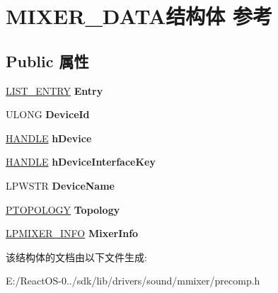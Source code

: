 \hypertarget{struct_m_i_x_e_r___d_a_t_a}{}\section{M\+I\+X\+E\+R\+\_\+\+D\+A\+T\+A结构体 参考}
\label{struct_m_i_x_e_r___d_a_t_a}
\subsection*{Public 属性}
\begin{DoxyCompactItemize}
\item 
\mbox{\label{struct_m_i_x_e_r___d_a_t_a_a5e96e18652301b34dc013bf62217f899}} 
\hyperlink{struct___l_i_s_t___e_n_t_r_y}{L\+I\+S\+T\+\_\+\+E\+N\+T\+RY} {\bfseries Entry}
\item 
\mbox{\label{struct_m_i_x_e_r___d_a_t_a_abdc3a2c200521c7c2b1d313d61b203a9}} 
U\+L\+O\+NG {\bfseries Device\+Id}
\item 
\mbox{\label{struct_m_i_x_e_r___d_a_t_a_a77656241f3f210dc3073d7c16db2c17e}} 
\hyperlink{interfacevoid}{H\+A\+N\+D\+LE} {\bfseries h\+Device}
\item 
\mbox{\label{struct_m_i_x_e_r___d_a_t_a_a84b496f9affb8659908b495a64a3d272}} 
\hyperlink{interfacevoid}{H\+A\+N\+D\+LE} {\bfseries h\+Device\+Interface\+Key}
\item 
\mbox{\label{struct_m_i_x_e_r___d_a_t_a_a9f918d7af68d9a28b7011cead0baae5c}} 
L\+P\+W\+S\+TR {\bfseries Device\+Name}
\item 
\mbox{\label{struct_m_i_x_e_r___d_a_t_a_ac47876d22db56fee7cafdf824836d337}} 
\hyperlink{struct_t_o_p_o_l_o_g_y}{P\+T\+O\+P\+O\+L\+O\+GY} {\bfseries Topology}
\item 
\mbox{\label{struct_m_i_x_e_r___d_a_t_a_a76ef841ffa0004d0939f18ace93895c2}} 
\hyperlink{struct_m_i_x_e_r___i_n_f_o}{L\+P\+M\+I\+X\+E\+R\+\_\+\+I\+N\+FO} {\bfseries Mixer\+Info}
\end{DoxyCompactItemize}


该结构体的文档由以下文件生成\+:\begin{DoxyCompactItemize}
\item 
E\+:/\+React\+O\+S-\/0../sdk/lib/drivers/sound/mmixer/precomp.\+h\end{DoxyCompactItemize}

